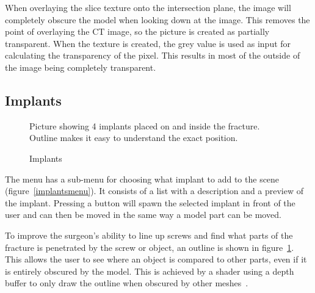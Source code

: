 \documentclass[a4paper]{report}
\begin{document}
When overlaying the slice texture onto the intersection plane, the image will completely obscure the model when looking down at the image. This removes the point of overlaying the CT image, so the picture is created as partially transparent. When the texture is created, the grey value is used as input for calculating the transparency of the pixel. This results in most of the outside of the image being completely transparent.

\subsection{Implants}

\begin{figure}[h!]
    \centering
	\hfill
	\caption{Implants}\label{implants}
  \small
  Picture showing 4 implants placed on and inside the fracture. Outline makes it easy to understand the exact position.
\end{figure}

The menu has a sub-menu for choosing what implant to add to the scene (figure~\ref{implantsmenu}). It consists of a list with a description and a preview of the implant. Pressing a button will spawn the selected implant in front of the user and can then be moved in the same way a model part can be moved.

To improve the surgeon's ability to line up screws and find what parts of the fracture is penetrated by the screw or object, an outline is shown in figure~\ref{implants}. This allows the user to see where an object is compared to other parts, even if it is entirely obscured by the model. This is achieved by a shader using a depth buffer to only draw the outline when obscured by other meshes~\cite{technologies_unity_nodate-1}.
\end{document}
